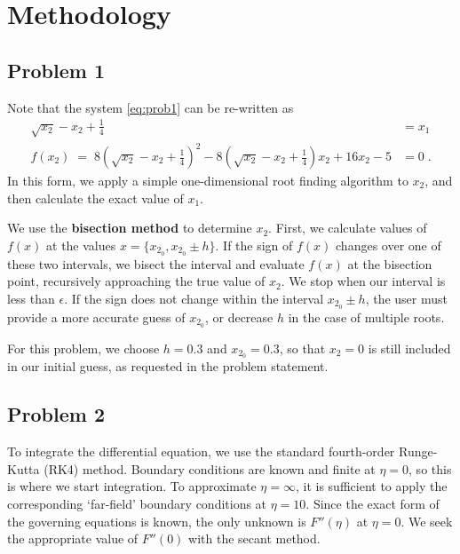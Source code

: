 \documentclass[12pt]{article}
\begin{document}
\section{Methodology} %

\subsection{Problem 1}

Note that the system \eqref{eq:prob1} can be re-written as
\begin{equation}
\begin{alignedat}{2}
\sqrt{x_2} - x_2 + \tfrac{1}{4} &= x_1 \\
f(x_2) \; = \; 8 \left( \sqrt{x_2} - x_2 + \tfrac{1}{4} \right)^2 - 8 \left( \sqrt{x_2} - x_2 + \tfrac{1}{4} \right) x_2 + 16 x_2 - 5  &= 0
\;.
\end{alignedat}
\label{eq:prob1rewrite}
\end{equation}
In this form, we apply a simple one-dimensional root finding algorithm to $x_2$, and then calculate the exact value of $x_1$.

We use the \textbf{bisection method} to determine $x_2$. First, we calculate values of $f(x)$ at the values $x = \{ x_{2_0}, x_{2_0} \pm h \}$. If the sign of $f(x)$ changes over one of these two intervals, we bisect the interval and evaluate $f(x)$ at the bisection point, recursively approaching the true value of $x_2$. We stop when our interval is less than $\epsilon$. If the sign does not change within the interval $x_{2_0} \pm h$, the user must provide a more accurate guess of $x_{2_0}$, or decrease $h$ in the case of multiple roots.

For this problem, we choose $h=0.3$ and $x_{2_0} = 0.3$, so that $x_2=0$ is still included in our initial guess, as requested in the problem statement.

\subsection{Problem 2}

To integrate the differential equation, we use the standard fourth-order Runge-Kutta (RK4) method. Boundary conditions are known and finite at $\eta = 0$, so this is where we start integration. To approximate $\eta = \infty$, it is sufficient to apply the corresponding `far-field' boundary conditions at $\eta = 10$. Since the exact form of the governing equations is known, the only unknown is $F''(\eta)$ at $\eta = 0$. We seek the appropriate value of $F''(0)$ with the secant method.
\end{document}
